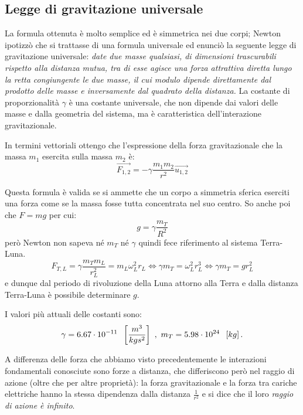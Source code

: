 \documentclass[class=book, crop=false, oneside, 12pt]{standalone}
\begin{document}
\subsection{Legge di gravitazione universale}

La formula ottenuta è molto semplice ed è simmetrica nei due corpi; 
Newton ipotizzò che si trattasse di una formula universale ed enunciò la seguente legge di gravitazione universale: \newline
\emph{date due masse qualsiasi, di dimensioni trascurabili rispetto alla distanza mutua, tra di esse agisce una forza attrattiva diretta lungo la retta congiungente le due masse, il cui modulo dipende direttamente dal prodotto delle masse e inversamente dal quadrato della distanza.}\newline
La costante di proporzionalità \(\gamma\) è una costante universale, che non dipende dai valori delle masse e dalla geometria del sistema, ma è caratteristica dell'interazione gravitazionale.

In termini vettoriali ottengo che l'espressione della forza gravitazionale che la massa \(m_1\) esercita sulla massa \(m_2\) è:
\begin{equation}
    \overrightarrow{F_{1,2}} = - \gamma \frac{m_1 m_2}{r^2} \overrightarrow{u_{1,2}}
\end{equation}

Questa formula è valida se si ammette che un corpo a simmetria sferica eserciti una forza come se la massa fosse tutta concentrata nel suo centro.
So anche poi che \(F = mg\) per cui:
\begin{equation}
    g = \gamma \frac{m_T}{R^2}
\end{equation}
però Newton non sapeva n\'e \(m_T\) n\'e \(\gamma\) quindi fece riferimento al sistema Terra-Luna.
\begin{equation}
    F_{T,L} = \gamma \frac{m_T m_L}{r_L^2} = m_L \omega_L^2 r_L \Leftrightarrow \gamma m_T = \omega_L^2 r_L^3 \Leftrightarrow \gamma m_T = g r_L^2
\end{equation}
e dunque dal periodo di rivoluzione della Luna attorno alla Terra e dalla distanza Terra-Luna è possibile determinare \(g\).

I valori più attuali delle costanti sono:
\begin{equation*}
    \gamma = 6.67 \cdot 10^{-11} \hspace{0.2cm} \left[\frac{m^3}{kg s^2}\right] \ , \ m_T = 5.98 \cdot 10^{24} \hspace{0.2cm} \left[kg\right] .
\end{equation*}

A differenza delle forza che abbiamo visto precedentemente le interazioni fondamentali conosciute sono forze a distanza, che differiscono però nel raggio di azione (oltre che per altre proprietà): 
la forza gravitazionale e la forza tra cariche elettriche hanno la stessa dipendenza dalla distanza $\frac{1}{r^2}$ e si dice che il loro \emph{raggio di azione è infinito}.
\end{document}
